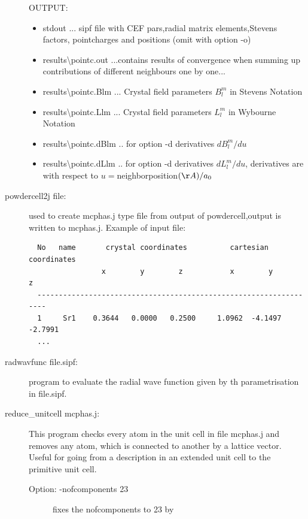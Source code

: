 \begin{description}
OUTPUT:
\begin{itemize}
\item         {\prg stdout} ... sipf file with CEF pars,radial matrix elements,Stevens factors,
                pointcharges and positions (omit with option -o)
\item         {\prg results\textbackslash pointc.out} ...contains results of convergence when summing up
                 contributions of different neighbours one by one...
\item         {\prg results\textbackslash pointc.Blm} ... Crystal field parameters $B_l^m$ in Stevens Notation
\item         {\prg results\textbackslash pointc.Llm} ... Crystal field parameters $L_l^m$ in Wybourne Notation
\item         {\prg results\textbackslash pointc.dBlm} .. for option -d derivatives $dB_l^m/du$
\item         {\prg results\textbackslash pointc.dLlm} .. for option -d  derivatives $dL_l^m/du$,
                  derivatives are with respect to $u=$neighborposition$(\AA)/a_0$            
\end{itemize}
\item [\prg powdercell2j\index{powdercell2j} file:]     used to create mcphas.j type file from %
output of powdercell,output is written to mcphas.j.  Example of input file:
\begin{verbatim}
  No   name       crystal coordinates          cartesian coordinates
                 x        y        z           x        y        z
  ------------------------------------------------------------------
  1     Sr1    0.3644   0.0000   0.2500     1.0962  -4.1497  -2.7991
  ...
  \end{verbatim}
\item[\prg radwavfunc\index{radwavfunc} file.sipf:] program to evaluate the radial wave function
given by th parametrisation in file.sipf.
\item[\prg reduce\_unitcell\index{reduce\_unitcell} mcphas.j:] 
                This program checks every atom in the unit cell in file mcphas.j and removes
                any atom, which is connected to another by a lattice vector. Useful for
                going from a description in an extended unit cell to the primitive unit cell.
\begin{description}
\item[Option: -nofcomponents 23] fixes the nofcomponents to 23 by 

\end{description}
\end{description}
